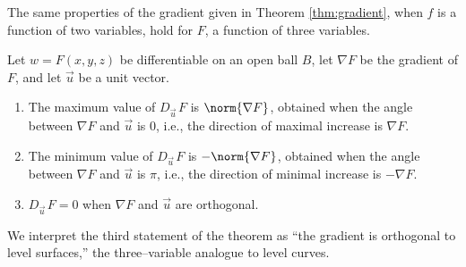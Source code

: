 The same properties of the gradient given in Theorem \ref{thm:gradient}, when $f$ is a function of two variables, hold for $F$, a function of three variables.

{Let $w=F(x,y,z)$ be differentiable on an open ball $B$, let $\nabla F$ be the gradient of $F$, and let $\vec u$ be a unit vector.
\begin{enumerate}
	\item The maximum value of $D_{\vec u\,}F$ is $\norm{\nabla F}$, obtained when the angle between $\nabla F$ and $\vec u$ is 0, i.e.,  the direction of maximal increase is $\nabla F$.
	\item The minimum value of $D_{\vec u\,}F$ is $-\norm{\nabla F}$, obtained when the angle between $\nabla F$ and $\vec u$ is $\pi$, i.e., the direction of minimal increase is $-\nabla F$.
	\item $D_{\vec u\,}F = 0$ when $\nabla F$ and $\vec u$ are orthogonal.
\end{enumerate}
}

We interpret the third statement of the theorem as ``the gradient is orthogonal to level surfaces,'' the three--variable analogue to level curves.\\

